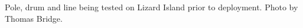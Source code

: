 \label{fig:pole} Pole, drum and line being tested on Lizard Island prior to deployment. Photo by Thomas Bridge.
    
